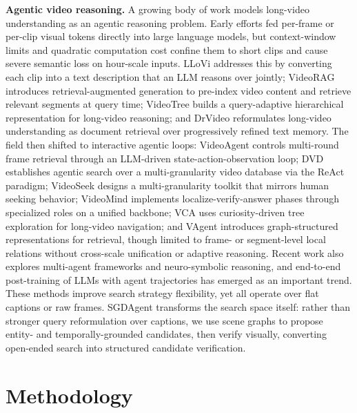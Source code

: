 \documentclass[sigconf, screen, review, anonymous]{acmart}
\begin{document}
\textbf{Agentic video reasoning.}
A growing body of work models long-video understanding as an agentic reasoning problem.  Early efforts fed per-frame or per-clip visual tokens directly into large language models\cite{video-llava2024,videochat2025}, but context-window limits and quadratic computation cost confine them to short clips and cause severe semantic loss on hour-scale inputs.  LLoVi\cite{zhang2024simplellm} addresses this by converting each clip into a text description that an LLM reasons over jointly; VideoRAG\cite{videorag2025} introduces retrieval-augmented generation to pre-index video content and retrieve relevant segments at query time; VideoTree\cite{videotree2025} builds a query-adaptive hierarchical representation for long-video reasoning; and DrVideo\cite{drvideo2025} reformulates long-video understanding as document retrieval over progressively refined text memory.  The field then shifted to interactive agentic loops: VideoAgent\cite{videoagent} controls multi-round frame retrieval through an LLM-driven state-action-observation loop; DVD\cite{deepvideo2025} establishes agentic search over a multi-granularity video database via the ReAct paradigm\cite{react2022}; VideoSeek\cite{videoseek} designs a multi-granularity toolkit that mirrors human seeking behavior; VideoMind\cite{videomind} implements localize-verify-answer phases through specialized roles on a unified backbone; VCA\cite{yang2025vca} uses curiosity-driven tree exploration for long-video navigation; and VAgent\cite{vagent2025} introduces graph-structured representations for retrieval, though limited to frame- or segment-level local relations without cross-scale unification or adaptive reasoning.  Recent work also explores multi-agent frameworks\cite{omagent2024} and neuro-symbolic reasoning\cite{neuro2020,cai2025naver}, and end-to-end post-training of LLMs with agent trajectories has emerged as an important trend\cite{team2026kimi,zeng2026glm}.  These methods improve search strategy flexibility, yet all operate over flat captions or raw frames. SGDAgent transforms the search space itself: rather than stronger query reformulation over captions, we use scene graphs to propose entity- and temporally-grounded candidates, then verify visually, converting open-ended search into structured candidate verification.
 
\section{Methodology}
\label{sec:method}
\end{document}
